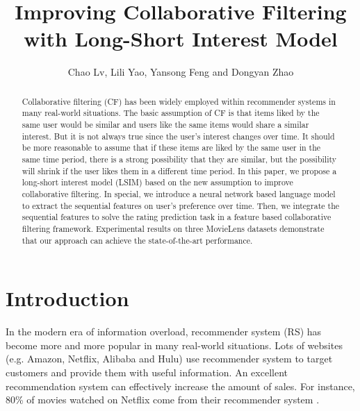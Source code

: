 \documentclass{llncs}
\begin{document}
%
\title{Improving Collaborative Filtering with Long-Short Interest Model}
%
\author{
	Chao Lv, Lili Yao, Yansong Feng\inst{*} and Dongyan Zhao
}
%
%
\maketitle
%
\begin{abstract}
Collaborative filtering (CF) has been widely employed within
recommender systems in many real-world situations.
The basic assumption of CF is that items liked by the same user would be similar and
users like the same items would share a similar interest.
But it is not always true since the user's interest changes over time.
It should be more reasonable to assume that
if these items are liked by the same user in the same time period,
there is a strong possibility that they are similar,
but the possibility will shrink if the user likes them in a different time period.
In this paper, we propose a long-short interest model (LSIM) based on
the new assumption to improve collaborative filtering.
In special, we introduce a neural network based language model
to extract the sequential features on user's preference over time.
Then, we integrate the sequential features to solve the rating prediction task
in a feature based collaborative filtering framework.
Experimental results on three MovieLens datasets demonstrate that
our approach can achieve the state-of-the-art performance.
\end{abstract}
%
\section{Introduction}
In the modern era of information overload,
recommender system (RS) has become more and more popular in many real-world situations.
Lots of websites (e.g. Amazon, Netflix, Alibaba and Hulu) use recommender system to
target customers and provide them with useful information.
An excellent recommendation system can effectively increase the amount of sales.
For instance, 80\% of movies watched on Netflix
come from their recommender system \cite{gomez2015netflix}.
\end{document}
